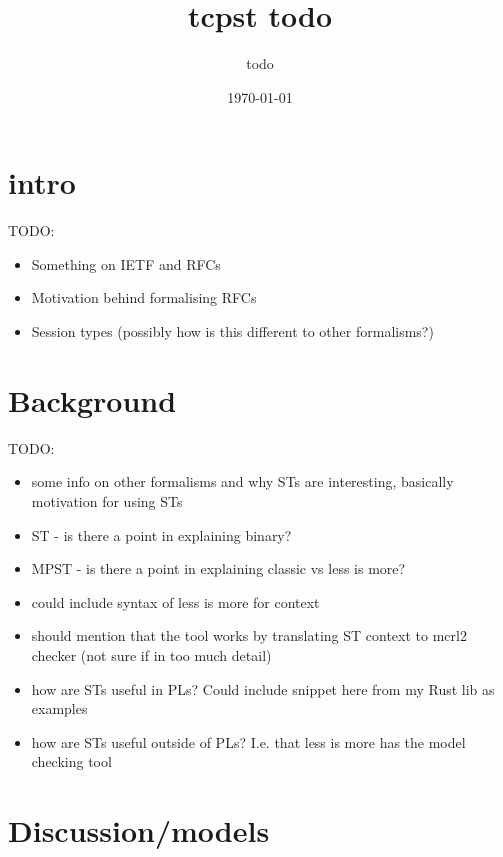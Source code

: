 \documentclass{article}
\title{tcpst todo}
\author{todo}
\date{\today}
\newcommand{\todo}[1]{}
\renewcommand{\todo}[1]{{\color{red} TODO: {#1}}}
\begin{document}
\maketitle

\section{intro}

\todo{
    \begin{itemize}
        \item Something on IETF and RFCs
        \item Motivation behind formalising RFCs
        \item Session types (possibly how is this different to other formalisms?)
    \end{itemize}
}

\section{Background}

\todo{
    \begin{itemize}
        \item some info on other formalisms and why STs are interesting, basically motivation for using STs
        \item ST - is there a point in explaining binary?
        \item MPST - is there a point in explaining classic vs less is more?
        \item could include syntax of less is more for context 
        \item should mention that the tool works by translating ST context to mcrl2 checker (not sure if in too much detail)
        \item how are STs useful in PLs? Could include snippet here from my Rust lib as examples
        \item how are STs useful outside of PLs? I.e. that less is more has the model checking tool
    \end{itemize}
}

\section{Discussion/models}
\end{document}
